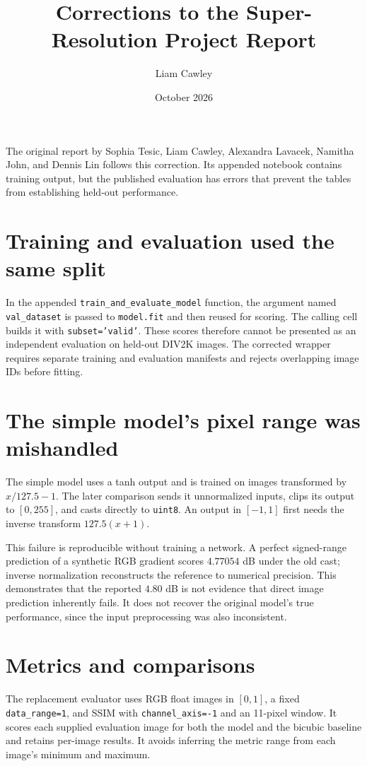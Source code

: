 \documentclass[11pt]{article}
\title{Corrections to the Super-Resolution Project Report}
\author{Liam Cawley}
\date{October 2026}
\begin{document}
\maketitle

The original report by Sophia Tesic, Liam Cawley, Alexandra Lavacek,
Namitha John, and Dennis Lin follows this correction. Its appended notebook
contains training output, but the published evaluation has errors that prevent
the tables from establishing held-out performance.

\section*{Training and evaluation used the same split}
In the appended \texttt{train\_and\_evaluate\_model} function, the argument named
\texttt{val\_dataset} is passed to \texttt{model.fit} and then reused for scoring.
The calling cell builds it with \texttt{subset='valid'}. These scores therefore
cannot be presented as an independent evaluation on held-out DIV2K images.
The corrected wrapper requires separate training and evaluation manifests and
rejects overlapping image IDs before fitting.

\section*{The simple model's pixel range was mishandled}
The simple model uses a tanh output and is trained on images transformed by
$x/127.5-1$. The later comparison sends it unnormalized inputs, clips its output
to $[0,255]$, and casts directly to \texttt{uint8}. An output in $[-1,1]$ first
needs the inverse transform $127.5(x+1)$.

This failure is reproducible without training a network. A perfect signed-range
prediction of a synthetic RGB gradient scores $4.77054$ dB under the old cast;
inverse normalization reconstructs the reference to numerical precision.
This demonstrates that the reported $4.80$ dB is not evidence that direct image
prediction inherently fails. It does not recover the original model's true
performance, since the input preprocessing was also inconsistent.

\section*{Metrics and comparisons}
The replacement evaluator uses RGB float images in $[0,1]$, a fixed
\texttt{data\_range=1}, and SSIM with \texttt{channel\_axis=-1} and an
11-pixel window. It scores each supplied evaluation image for both the model
and the bicubic baseline and retains per-image results.
It avoids inferring the metric range from each image's minimum and maximum.
\end{document}
